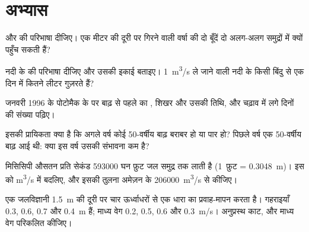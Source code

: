 \section{अभ्यास}

\begin{exercise}[$\star$]\label{exo:g10:drainage-basins:1}
 और  की परिभाषा दीजिए। एक मीटर की दूरी पर गिरने वाली वर्षा की दो बूँदें
दो अलग-अलग समुद्रों में क्यों पहुँच सकती हैं?
\end{exercise}

\begin{exercise}[$\star$]\label{exo:g10:drainage-basins:2}
नदी के  की परिभाषा दीजिए और उसकी इकाई बताइए। \qty{1}{m^3/s} ले जाने वाली नदी के किसी
बिंदु से एक दिन में कितने लीटर गुज़रते हैं?
\end{exercise}

\begin{exercise}[$\star$]\label{exo:g10:drainage-basins:3}
जनवरी 1996 के पोटोमैक के  पर बाढ़ से पहले का ,
शिखर  और उसकी तिथि, और चढ़ाव में लगे
दिनों की संख्या पढ़िए।
\end{exercise}

\begin{exercise}[$\star$]\label{exo:g10:drainage-basins:4}
इसकी प्रायिकता क्या है कि अगले वर्ष कोई \num{50}-वर्षीय बाढ़ बराबर हो या पार हो?
पिछले वर्ष एक \num{50}-वर्षीय बाढ़ आई थी: क्या इस वर्ष उसकी संभावना कम
है?
\end{exercise}

\begin{exercise}[$\star$]\label{exo:g10:drainage-basins:5}
मिसिसिपी औसतन प्रति सेकंड \num{593000} घन फ़ुट जल
समुद्र तक लाती है (\num{1}~फ़ुट = \qty{0.3048}{m})। इस  को
\unit{m^3/s} में बदलिए, और इसकी तुलना अमेज़न के \qty{206000}{m^3/s} से
कीजिए।
\end{exercise}

\begin{exercise}[$\star\star$]\label{exo:g10:drainage-basins:6}
एक जलविज्ञानी \qty{1.5}{m} की दूरी पर चार ऊर्ध्वाधरों से एक धारा का प्रवाह-मापन करता है।
गहराइयाँ \num{0.3}, \num{0.6}, \num{0.7} और \qty{0.4}{m} हैं; माध्य
वेग \num{0.2}, \num{0.5}, \num{0.6} और \qty{0.3}{m/s}। अनुप्रस्थ
काट,  और माध्य वेग परिकलित कीजिए।
\end{exercise}

